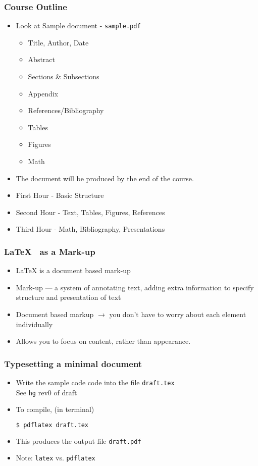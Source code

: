 \documentclass{beamer}
\newcommand{\typ}[1]{\lstinline{#1}}
\begin{document}
\begin{frame}
  \frametitle{Course Outline}
  \begin{itemize}
  \item Look at Sample document - \typ{sample.pdf}
    \begin{itemize}
    \item Title, Author, Date
    \item Abstract
    \item Sections \& Subsections
    \item Appendix
    \item References/Bibliography
    \item Tables
    \item Figures
    \item Math
    \end{itemize}
  \item The document will be produced by the end of the course. 
  \item First Hour - Basic Structure
  \item Second Hour - Text, Tables, Figures, References
  \item Third Hour - Math, Bibliography, Presentations
  \end{itemize}
\end{frame}

\begin{frame}[fragile]
  \frametitle{\LaTeX~ as a Mark-up}
  \begin{itemize}
  \item {\LaTeX} is a document based mark-up
  \item Mark-up --- a system of annotating text, adding extra
    information to specify structure and presentation of text
  \item Document based markup $\rightarrow$ you don't have to worry
    about each element individually 
  \item Allows you to focus on content, rather than appearance.
  \end{itemize}
\end{frame}

\begin{frame}[fragile]
  \frametitle{Typesetting a minimal document}
  \begin{itemize}
  \item Write the sample code  code into the file \typ{draft.tex}\\
      {\tiny See \typ{hg} rev0 of draft}
  \item   To compile, (in terminal) \\
    \begin{lstlisting}[language=bash]
      $ pdflatex draft.tex
    \end{lstlisting} %
  \item This produces the output file \typ{draft.pdf} 
  \item \alert{Note:} \typ{latex} vs. \typ{pdflatex} 
  \end{itemize}
\end{frame}  
\end{document}
